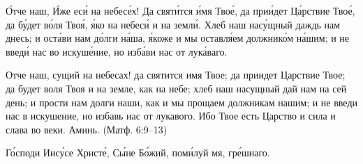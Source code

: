 \label{_content_molitvi}

\begin{mymulticols}



\'{О}тче наш, \'{И}же ес\'{и} на небес\'{е}х! Да свят\'{и}тся \'{и}мя Тво\'{е}, да при\'{и}дет Ц\'{а}рствие Тво\'{е}, да б\'{у}дет в\'{о}ля Тво\'{я}, \'{я}ко на небес\'{и} и на земл\'{и}. Хлеб наш нас\'{у}щный даждь нам днесь; и ост\'{а}ви нам д\'{о}лги н\'{а}ша, \'{я}коже и мы оставл\'{я}ем должник\'{о}м н\'{а}шим; и не введ\'{и} нас во искуш\'{е}ние, но изб\'{а}ви нас от лук\'{а}ваго.

Отче наш, сущий на небесах! да святится имя Твое; да приидет Царствие Твое; да будет воля Твоя и на земле, как на небе; хлеб наш насущный дай нам на сей день; и прости нам долги наши, как и мы прощаем должникам нашим; и не введи нас в искушение, но избавь нас от лукавого. Ибо Твое есть Царство и сила и слава во веки. Аминь. (Матф. 6:9--13)


\end{mymulticols}

\mychapterending




{\centering Г\'{о}споди Иис\'{у}се Христ\'{е}, С\'{ы}не Б\'{о}жий, пом\'{и}луй мя, гр\'{е}шнаго.\par}

\mychapterending

